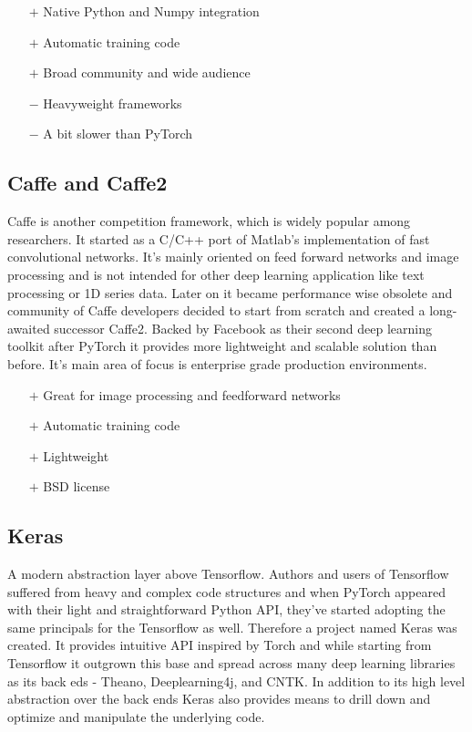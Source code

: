 \begin{itemize}
    \item[$\boldsymbol{+}$] Native Python and Numpy integration
    \item[$\boldsymbol{+}$] Automatic training code
    \item[$\boldsymbol{+}$] Broad community and wide audience
    \item[$\boldsymbol{-}$] Heavyweight frameworks
    \item[$\boldsymbol{-}$] A bit slower than PyTorch
\end{itemize}

\subsection{Caffe and Caffe2}

Caffe is another competition framework, which is widely popular among researchers. It started as a C/C++ port of Matlab's implementation of fast convolutional networks. It's mainly oriented on feed forward networks and image processing and is not intended for other deep learning application like text processing or 1D series data. Later on it became performance wise obsolete and community of Caffe developers decided to start from scratch and created a long-awaited successor Caffe2. Backed by Facebook as their second deep learning toolkit after PyTorch it provides more lightweight and scalable solution than before. It's main area of focus is enterprise grade production environments.

\begin{itemize}
    \item[$\boldsymbol{+}$] Great for image processing and feedforward networks
    \item[$\boldsymbol{+}$] Automatic training code
    \item[$\boldsymbol{+}$] Lightweight
    \item[$\boldsymbol{+}$] BSD license
\end{itemize}

\subsection{Keras}

A modern abstraction layer above Tensorflow. Authors and users of Tensorflow suffered from heavy and complex code structures and when PyTorch appeared with their light and straightforward Python API, they've started adopting the same principals for the Tensorflow as well. Therefore a project named Keras was created. It provides intuitive API inspired by Torch and while starting from Tensorflow it outgrown this base and spread across many deep learning libraries as its back eds - Theano, Deeplearning4j, and CNTK. In addition to its high level abstraction over the back ends Keras also provides means to drill down and optimize and manipulate the underlying code.


